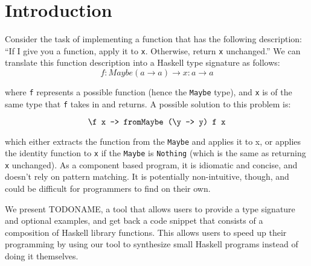 \documentclass[acmsmall,nonacm]{acmart}
\begin{document}
\maketitle

\section{Introduction}


Consider the task of implementing a function that has the following 
description: “If I give you a function, apply it to \verb|x|. Otherwise, 
return \verb|x| unchanged.” We can translate this function description 
into a Haskell type signature as follows: 
\begin{equation}
  \label{query1}
  f:Maybe (a \to a) \to x:a \to a
\end{equation}

\noindent where \verb|f| represents a possible function (hence the \verb|Maybe| type), and 
\verb|x| is of the same type that \verb|f| takes in and returns. A possible 
solution to this problem is:

\begin{equation}
  \label{solution1}
  \verb|\f x -> fromMaybe (\y -> y) f x|
\end{equation}

\noindent which either extracts the function from the \verb|Maybe| and applies it to x, 
or applies the identity function to \verb|x| if the \verb|Maybe| is \verb|Nothing|
(which is the same as returning \verb|x| unchanged). As a component based program,
it is idiomatic and concise, and doesn't rely on pattern matching.  
It is potentially non-intuitive, though, and could be difficult 
for programmers to find on their own. 

We present TODONAME, a tool that allows users to provide a type signature and 
optional examples, and get back a code snippet 
that consists of a composition of Haskell library functions. This allows
users to speed up their programming by using our tool to synthesize small 
Haskell programs instead of doing it themselves. 

\end{document}
